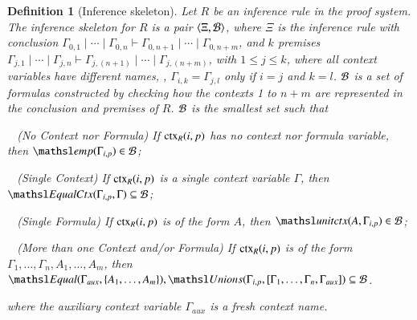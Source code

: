 \documentclass{new_tlp}
\newcommand{\elin}[2]{\ensuremath{{\tsl{unitctx}(\ensuremath{#1}, \ensuremath{#2})}}}
\newcommand{\emp}[1]{\ensuremath{{\tsl{emp}(\ensuremath{#1})}}}
\newcommand{\unions}[2]{\ensuremath{\tsl{Unions}(\ensuremath{#1},\ensuremath{#2})}}
\newcommand{\equal}[2]{\ensuremath{\tsl{Equal}(\ensuremath{#1},\ensuremath{#2})}}
\newcommand{\equalCtx}[2]{\ensuremath{\tsl{EqualCtx}(\ensuremath{#1},\ensuremath{#2})}}
\newtheorem{definition}[theorem]{Definition}
\begin{document}
\begin{definition}[Inference skeleton]
\label{def:inference-skeleton}
Let $R$ be an inference rule in the proof system. 
The \emph{inference skeleton} for $R$ is a pair $\tup{\Xi, \Bscr}$, 
where $\Xi$ is the inference rule 
with conclusion $\Gamma_{0,1}  \mid \cdots \mid \Gamma_{0,n} \vdash 
\Gamma_{0,n+1} \mid \cdots \mid \Gamma_{0,n + m}$, and $k$ premises 
$\Gamma_{j,1}  \mid \cdots \mid \Gamma_{j,n} \vdash \Gamma_{j,(n+1)} \mid \cdots \mid \Gamma_{j,(n+m)}$, 
with $1 \leq j \leq k$, where all context variables have different names, \ie, 
$\Gamma_{i,k} = \Gamma_{j,l}$ only if $i = j$ and $k = l$.
$\Bscr$ is a set of formulas constructed by checking 
how the contexts 1 to $n+m$ are represented in the conclusion and premises of
$R$. 
$\Bscr$ is the smallest set such that

\noindent
\textbullet~ (No Context nor Formula) If $\textrm{ctx}_R(i,p)$ has no context nor formula variable, then $\emp{\Gamma_{i,p}} \in \Bscr$;

\noindent
\textbullet~ (Single Context) If $\textrm{ctx}_R(i,p)$ is a single context variable $\Gamma$, then $\equalCtx{\Gamma_{i,p}}{\Gamma} \subseteq \Bscr$;

\noindent
\textbullet~ (Single Formula) If $\textrm{ctx}_R(i,p)$ is of the form $A$, then $\elin{A}{\Gamma_{i,p}} \in \Bscr$;

\noindent
\textbullet~ (More than one Context and/or Formula) If $\textrm{ctx}_R(i,p)$ is of the form $\Gamma_1, \ldots, \Gamma_n, A_1, \ldots, A_m$, 
 then $\equal{\Gamma_{aux}}{\{A_1, \ldots, A_m\}}, \unions{\Gamma_{i,p}}{[\Gamma_1, \ldots, \Gamma_n, 
 \Gamma_{aux}]} \subseteq \Bscr$.

 \noindent
where the auxiliary context variable $\Gamma_{aux}$ is a fresh context name. 
\end{definition}

\end{document}
